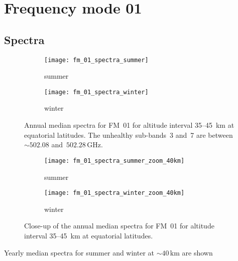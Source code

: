 \section{Frequency mode 01}
\label{FM01}

\subsection{Spectra}
\label{FM01:spectra}

\begin{figure}[ht]
    \centering
    \begin{subfigure}[b]{0.9545\textwidth}
        \texttt{[image: fm\_01\_spectra\_summer]}
        \caption{summer}\label{fig:spectra:01:summer}
    \end{subfigure}
    \begin{subfigure}[b]{0.9545\textwidth}
        \texttt{[image: fm\_01\_spectra\_winter]}
        \caption{winter}\label{fig:spectra:01:winter}
    \end{subfigure}
    \caption{Annual median spectra for FM~01 for altitude interval 35--45~km at
        equatorial latitudes. The unhealthy sub-bands~3 and~7 are between
        $\sim502.08$ and~$502.28\,\mathrm{GHz}$.
        }\label{fig:spectra:01}
\end{figure}

\begin{figure}[ht]
    \centering
    \begin{subfigure}[b]{0.9545\textwidth}
        \texttt{[image: fm\_01\_spectra\_summer\_zoom\_40km]}
        \caption{summer}\label{fig:spectra:01:summer:closeup}
    \end{subfigure}
    \begin{subfigure}[b]{0.9545\textwidth}
        \texttt{[image: fm\_01\_spectra\_winter\_zoom\_40km]}
        \caption{winter}\label{fig:spectra:01:winter:closeup}
    \end{subfigure}
    \caption{Close-up of the annual median spectra for FM~01 for altitude
        interval 35--45~km at equatorial latitudes.
        }\label{fig:spectra:01:closeup}
\end{figure}

\noindent
Yearly median spectra for summer and winter at $\sim40\,\mathrm{km}$ are shown


